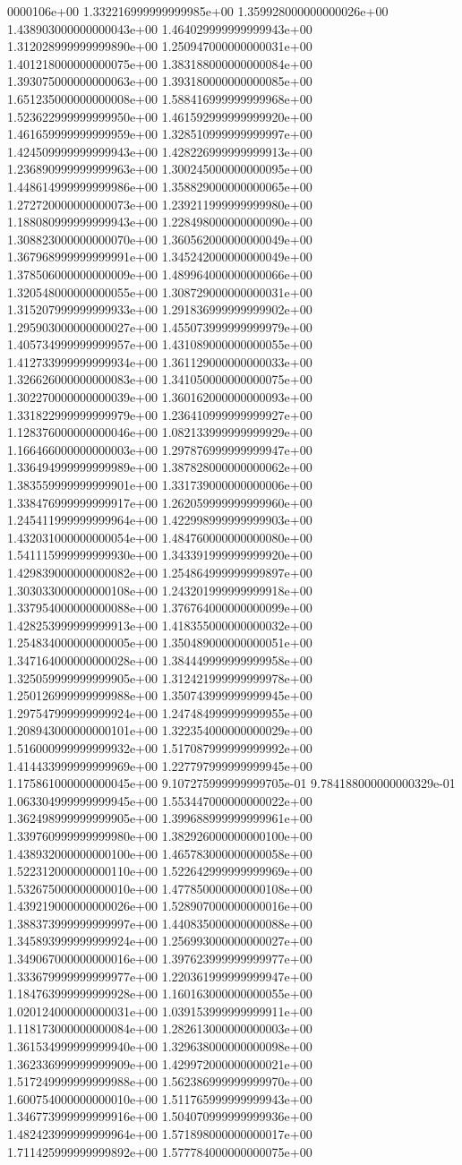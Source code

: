 0000106e+00	1.332216999999999985e+00	1.359928000000000026e+00	1.438903000000000043e+00	1.464029999999999943e+00	1.312028999999999890e+00	1.250947000000000031e+00	1.401218000000000075e+00	1.383188000000000084e+00	1.393075000000000063e+00	1.393180000000000085e+00	1.651235000000000008e+00	1.588416999999999968e+00	1.523622999999999950e+00	1.461592999999999920e+00	1.461659999999999959e+00	1.328510999999999997e+00	1.424509999999999943e+00	1.428226999999999913e+00	1.236890999999999963e+00	1.300245000000000095e+00	1.448614999999999986e+00	1.358829000000000065e+00	1.272720000000000073e+00	1.239211999999999980e+00	1.188080999999999943e+00	1.228498000000000090e+00	1.308823000000000070e+00	1.360562000000000049e+00	1.367968999999999991e+00	1.345242000000000049e+00	1.378506000000000009e+00	1.489964000000000066e+00	1.320548000000000055e+00	1.308729000000000031e+00	1.315207999999999933e+00	1.291836999999999902e+00	1.295903000000000027e+00	1.455073999999999979e+00	1.405734999999999957e+00	1.431089000000000055e+00	1.412733999999999934e+00	1.361129000000000033e+00	1.326626000000000083e+00	1.341050000000000075e+00	1.302270000000000039e+00	1.360162000000000093e+00	1.331822999999999979e+00	1.236410999999999927e+00	1.128376000000000046e+00	1.082133999999999929e+00	1.166466000000000003e+00	1.297876999999999947e+00	1.336494999999999989e+00	1.387828000000000062e+00	1.383559999999999901e+00	1.331739000000000006e+00	1.338476999999999917e+00	1.262059999999999960e+00	1.245411999999999964e+00	1.422998999999999903e+00	1.432031000000000054e+00	1.484760000000000080e+00	1.541115999999999930e+00	1.343391999999999920e+00	1.429839000000000082e+00	1.254864999999999897e+00	1.303033000000000108e+00	1.243201999999999918e+00	1.337954000000000088e+00	1.376764000000000099e+00	1.428253999999999913e+00	1.418355000000000032e+00	1.254834000000000005e+00	1.350489000000000051e+00	1.347164000000000028e+00	1.384449999999999958e+00	1.325059999999999905e+00	1.312421999999999978e+00	1.250126999999999988e+00	1.350743999999999945e+00	1.297547999999999924e+00	1.247484999999999955e+00	1.208943000000000101e+00	1.322354000000000029e+00	1.516000999999999932e+00	1.517087999999999992e+00	1.414433999999999969e+00	1.227797999999999945e+00	1.175861000000000045e+00	9.107275999999999705e-01	9.784188000000000329e-01	1.063304999999999945e+00	1.553447000000000022e+00	1.362498999999999905e+00	1.399688999999999961e+00	1.339760999999999980e+00	1.382926000000000100e+00	1.438932000000000100e+00	1.465783000000000058e+00	1.522312000000000110e+00	1.522642999999999969e+00	1.532675000000000010e+00	1.477850000000000108e+00	1.439219000000000026e+00	1.528907000000000016e+00	1.388373999999999997e+00	1.440835000000000088e+00	1.345893999999999924e+00	1.256993000000000027e+00	1.349067000000000016e+00	1.397623999999999977e+00	1.333679999999999977e+00	1.220361999999999947e+00	1.184763999999999928e+00	1.160163000000000055e+00	1.020124000000000031e+00	1.039153999999999911e+00	1.118173000000000084e+00	1.282613000000000003e+00	1.361534999999999940e+00	1.329638000000000098e+00	1.362336999999999909e+00	1.429972000000000021e+00	1.517249999999999988e+00	1.562386999999999970e+00	1.600754000000000010e+00	1.511765999999999943e+00	1.346773999999999916e+00	1.504070999999999936e+00	1.482423999999999964e+00	1.571898000000000017e+00	1.711425999999999892e+00	1.577784000000000075e+00